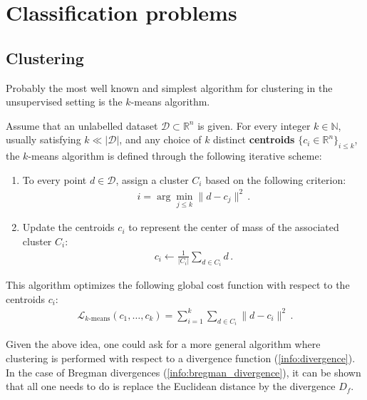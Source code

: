 \section{Classification problems}
\subsection{Clustering}

    Probably the most well known and simplest algorithm for clustering in the unsupervised setting is the $k$-means algorithm.
    \begin{method}
        Assume that an unlabelled dataset $\mathcal{D}\subset\mathbb{R}^n$ is given. For every integer $k\in\mathbb{N}$, usually satisfying $k\ll|\mathcal{D}|$, and any choice of $k$ distinct \textbf{centroids} $\{c_i\in\mathbb{R}^n\}_{i\leq k}$, the $k$-means algorithm is defined through the following iterative scheme:
        \begin{enumerate}
            \item To every point $d\in\mathcal{D}$, assign a cluster $C_i$ based on the following criterion:
            \begin{gather}
                i = \arg\min_{j\leq k}\|d-c_j\|^2\,.
            \end{gather}
            \item Update the centroids $c_i$ to represent the center of mass of the associated cluster $C_i$:
            \begin{gather}
                c_i\longleftarrow\frac{1}{|C_i|}\sum_{d\in C_i}d\,.
            \end{gather}
        \end{enumerate}
        This algorithm optimizes the following global cost function with respect to the centroids $c_i$:
        \begin{gather}
            \mathcal{L}_{k\text{-means}}(c_1,\ldots,c_k) = \sum_{i=1}^k\sum_{d\in C_i}\|d - c_i\|^2\,.
        \end{gather}
    \end{method}
    Given the above idea, one could ask for a more general algorithm where clustering is performed with respect to a divergence function (\cref{info:divergence}). In the case of Bregman divergences (\cref{info:bregman_divergence}), it can be shown that all one needs to do is replace the Euclidean distance by the divergence $D_f$.
